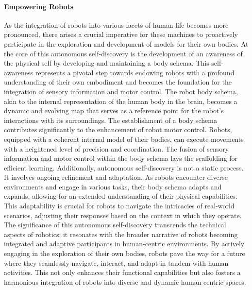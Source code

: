\paragraph*{Empowering Robots} As the integration of robots into various facets of human life becomes more pronounced, there arises a crucial imperative for these machines to proactively participate in the exploration and development of models for their own bodies. At the core of this autonomous self-discovery is the development of an awareness of the physical self by developing and maintaining a body schema. This self-awareness represents a pivotal step towards endowing robots with a profound understanding of their own embodiment and becomes the foundation for the integration of sensory information and motor control. The robot body schema, akin to the internal representation of the human body in the brain, becomes a dynamic and evolving map that serves as a reference point for the robot's interactions with its surroundings. The establishment of a body schema contributes significantly to the enhancement of robot motor control. Robots, equipped with a coherent internal model of their bodies, can execute movements with a heightened level of precision and coordination. The fusion of sensory information and motor control within the body schema lays the scaffolding for efficient learning. Additionally, autonomous self-discovery is not a static process. It involves ongoing refinement and adaptation. As robots encounter diverse environments and engage in various tasks, their body schema adapts and expands, allowing for an extended understanding of their physical capabilities. This adaptability is crucial for robots to navigate the intricacies of real-world scenarios, adjusting their responses based on the context in which they operate. The significance of this autonomous self-discovery transcends the technical aspects of robotics; it resonates with the broader narrative of robots becoming integrated and adaptive participants in human-centric environments. By actively engaging in the exploration of their own bodies, robots pave the way for a future where they seamlessly navigate, interact, and adapt in tandem with human activities. This not only enhances their functional capabilities but also fosters a harmonious integration of robots into diverse and dynamic human-centric spaces.

